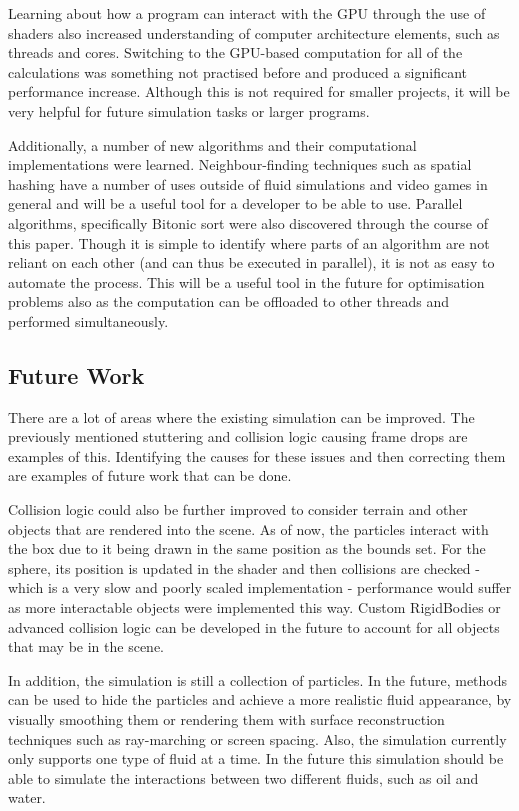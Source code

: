\documentclass[a4paper, 12pt]{article}
\begin{document}
    Learning about how a program can interact with the GPU through the use of shaders also increased understanding of computer architecture elements, such as threads and cores. Switching to the GPU-based computation for all of the calculations was something not practised before and produced a significant performance increase. Although this is not required for smaller projects, it will be very helpful for future simulation tasks or larger programs.
    
    Additionally, a number of new algorithms and their computational implementations were learned. Neighbour-finding techniques such as spatial hashing have a number of uses outside of fluid simulations and video games in general and will be a useful tool for a developer to be able to use. Parallel algorithms, specifically Bitonic sort were also discovered through the course of this paper. Though it is simple to identify where parts of an algorithm are not reliant on each other (and can thus be executed in parallel), it is not as easy to automate the process. This will be a useful tool in the future for optimisation problems also as the computation can be offloaded to other threads and performed simultaneously.

    \subsection{Future Work}

    There are a lot of areas where the existing simulation can be improved. The previously mentioned stuttering and collision logic causing frame drops are examples of this. Identifying the causes for these issues and then correcting them are examples of future work that can be done.
    
    Collision logic could also be further improved to consider terrain and other objects that are rendered into the scene. As of now, the particles interact with the box due to it being drawn in the same position as the bounds set. For the sphere, its position is updated in the shader and then collisions are checked - which is a very slow and poorly scaled implementation - performance would suffer as more interactable objects were implemented this way. Custom RigidBodies or advanced collision logic can be developed in the future to account for all objects that may be in the scene.

    In addition, the simulation is still a collection of particles. In the future, methods can be used to hide the particles and achieve a more realistic fluid appearance, by visually smoothing them or rendering them with surface reconstruction techniques such as ray-marching or screen spacing. Also, the simulation currently only supports one type of fluid at a time. In the future this simulation should be able to simulate the interactions between two different fluids, such as oil and water.
    
\end{document}
